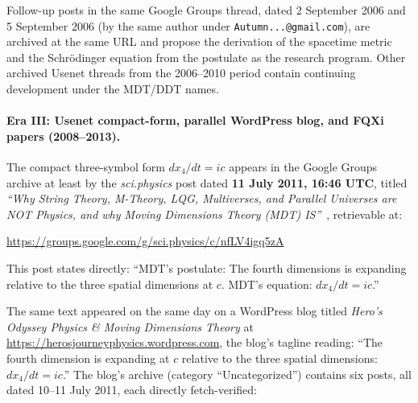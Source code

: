 \documentclass[11pt,a4paper]{article}
\begin{document}
Follow-up posts in the same Google Groups thread, dated 2 September 2006 and 5 September 2006 (by the same author under \texttt{Autumn...@gmail.com}), are archived at the same URL and propose the derivation of the spacetime metric and the Schr\"odinger equation from the postulate as the research program. Other archived Usenet threads from the 2006--2010 period contain continuing development under the MDT/DDT names.

\paragraph{Era III: Usenet compact-form, parallel WordPress blog, and FQXi papers (2008--2013).} The compact three-symbol form $dx_4/dt = ic$ appears in the Google Groups archive at least by the \emph{sci.physics} post dated \textbf{11 July 2011, 16:46 UTC}, titled \emph{``Why String Theory, M-Theory, LQG, Multiverses, and Parallel Universes are NOT Physics, and why Moving Dimensions Theory (MDT) IS''}~\cite{mcgucken2011usenet}, retrievable at:
\begin{center}
\url{https://groups.google.com/g/sci.physics/c/nfLV4igq5zA}
\end{center}
This post states directly: ``MDT's postulate: The fourth dimensions is expanding relative to the three spatial dimensions at $c$. MDT's equation: $dx_4/dt = ic$.''

The same text appeared on the same day on a WordPress blog titled \emph{Hero's Odyssey Physics \& Moving Dimensions Theory} at \url{https://herosjourneyphysics.wordpress.com}, the blog's tagline reading: ``The fourth dimension is expanding at $c$ relative to the three spatial dimensions: $dx_4/dt = ic$.'' The blog's archive (category ``Uncategorized'') contains six posts, all dated 10--11 July 2011, each directly fetch-verified:
\end{document}
